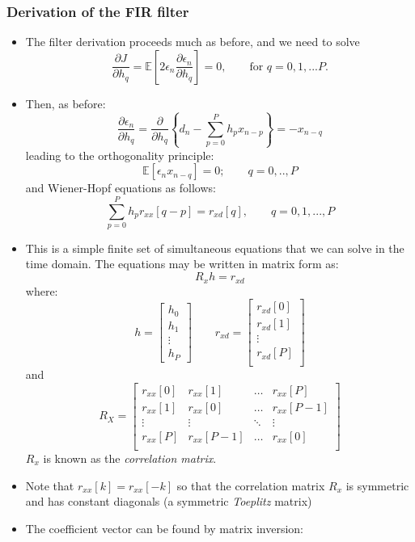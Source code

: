 \documentclass[12pt]{article}
\newcommand{\titc}[1]{\textit{\textcolor{blue1}{#1}}}
\newcommand{\dydx}[2]{\frac{\partial{#1}}{\partial{#2}}}
\newcommand{\mexp}{\mathbb{E}}
\newcommand{\summ}[2]{\sum_{#1}^{#2}}
\newcommand{\sumpzerop}{\summ{p=0}{P}}
\newcommand{\autocox}{r_{xx}}
\newcommand{\err}{\epsilon_n}
\begin{document}
    \subsubsection{Derivation of the FIR filter}
    \begin{itemize}
    \item The filter derivation proceeds much as before, and we need to solve 
    \[
    \dydx{J}{h_q} = \mexp\left[ 2\err \dydx{\err}{h_q}\right] = 0, \qquad \textrm{for } q=0,1,...P.
    \]
    \item Then, as before:
    \[
    \dydx{\err}{h_q} = \dydx{}{h_q}\left\{ d_n - \sumpzerop h_p x_{n-p}\right\} = - x_{n-q}
    \]
    leading to the orthogonality principle:
    \[
    \mexp[\err x_{n-q}] = 0; \qquad q=0,..,P
    \]
    and Wiener-Hopf equations as follows:
    \[
    \sumpzerop h_p r_{xx}[q-p] = r_{xd}[q], \qquad q=0,1,...,P
    \]
    \item This is a simple finite set of simultaneous equations that we can solve in the time domain. The equations may be written in matrix form as:
    \[
    R_x h = r_{xd}
    \]
    where:
    \[
    h = \begin{bmatrix}
    h_0 \\
    h_1 \\
    \vdots \\
    h_P
    \end{bmatrix}
    \qquad 
    r_{xd} = \begin{bmatrix}
    r_{xd}[0]\\
    r_{xd}[1]\\
    \vdots \\
    r_{xd}[P]\\
    \end{bmatrix}
    \]
    and 
    \[
    R_X = \begin{bmatrix}
    r_{xx}[0] & r_{xx}[1] & \hdots & r_{xx}[P] \\
    r_{xx}[1] & r_{xx}[0] & \hdots & r_{xx}[P-1] \\
    \vdots & \vdots & \ddots & \vdots \\
    r_{xx}[P] & r_{xx}[P-1] & \hdots & r_{xx}[0] \\
    \end{bmatrix}
    \]
    $R_x$ is known as the \titc{correlation matrix}.
    \item Note that $\autocox[k]=\autocox[-k]$ so that the correlation matrix $R_x$ is symmetric and has constant diagonals (a symmetric \titc{Toeplitz} matrix)
    \item The coefficient vector can be found by matrix inversion:

\end{itemize}
\end{document}
